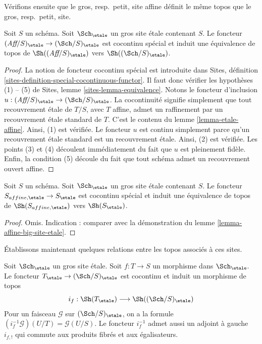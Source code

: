 \noindent
Vérifions ensuite que le gros, resp.\ petit, site affine définit le même
topos que le gros, resp.\ petit, site.

\begin{lemma}
\label{lemma-affine-big-site-etale}
Soit $S$ un schéma. Soit $\Sch_\etale$ un gros site
étale contenant $S$.
Le foncteur
$(\textit{Aff}/S)_\etale \to (\Sch/S)_\etale$
est cocontinu spécial et induit une équivalence de topos de
$\Sh((\textit{Aff}/S)_\etale)$ vers
$\Sh((\Sch/S)_\etale)$.
\end{lemma}

\begin{proof}
La notion de foncteur cocontinu spécial est introduite dans
Sites, définition \ref{sites-definition-special-cocontinuous-functor}.
Il faut donc vérifier les hypothèses (1) -- (5) de
Sites, lemme \ref{sites-lemma-equivalence}.
Notons le foncteur d'inclusion
$u : (\textit{Aff}/S)_\etale \to (\Sch/S)_\etale$.
La cocontinuité signifie simplement que tout recouvrement étale de
$T/S$, avec $T$ affine, admet un raffinement par un recouvrement étale standard de $T$.
C'est le contenu du
lemme \ref{lemma-etale-affine}.
Ainsi, (1) est vérifiée. Le foncteur $u$ est continu simplement parce qu'un recouvrement
étale standard est un recouvrement étale. Ainsi, (2) est vérifiée.
Les points (3) et (4) découlent immédiatement du fait que $u$ est
pleinement fidèle. Enfin, la condition (5) découle du
fait que tout schéma admet un recouvrement ouvert affine.
\end{proof}

\begin{lemma}
\label{lemma-alternative}
Soit $S$ un schéma. Soit $\Sch_\etale$ un gros site
étale contenant $S$. Le foncteur $S_{affine, \etale} \to S_\etale$
est cocontinu spécial et induit une équivalence de topos de
$\Sh(S_{affine, \etale})$ vers $\Sh(S_\etale)$.
\end{lemma}

\begin{proof}
Omis. Indication : comparer avec la démonstration du
lemme \ref{lemma-affine-big-site-etale}.
\end{proof}

\noindent
Établissons maintenant quelques relations entre les topos
associés à ces sites.

\begin{lemma}
\label{lemma-put-in-T-etale}
Soit $\Sch_\etale$ un gros site étale.
Soit $f : T \to S$ un morphisme dans $\Sch_\etale$.
Le foncteur $T_\etale \to (\Sch/S)_\etale$
est cocontinu et induit un morphisme de topos
$$
i_f :
\Sh(T_\etale)
\longrightarrow
\Sh((\Sch/S)_\etale)
$$
Pour un faisceau $\mathcal{G}$ sur $(\Sch/S)_\etale$,
on a la formule $(i_f^{-1}\mathcal{G})(U/T) = \mathcal{G}(U/S)$.
Le foncteur $i_f^{-1}$ admet aussi un adjoint à gauche $i_{f, !}$ qui commute
aux produits fibrés et aux égalisateurs.
\end{lemma}

